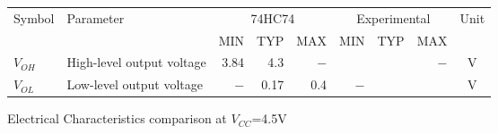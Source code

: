 \begin{tabular}{|l|l|r|r|r|r|r|r|c|}
    \toprule
    Symbol  &Parameter  &\multicolumn{3}{|c|}{74HC74}&\multicolumn{3}{|c|}{Experimental}&Unit\\
            &           &   MIN&TYP&MAX&MIN&TYP&MAX&\\
    \midrule
    $V_{OH}$&High-level output voltage&3.84&4.3&$-$&  &  &$-$&V\\
    $V_{OL}$&Low-level output voltage &$-$&0.17&0.4&$-$&  &  &V\\
    \bottomrule
\end{tabular}
\caption{Electrical Characteristics comparison at $V_{CC}$=4.5V}